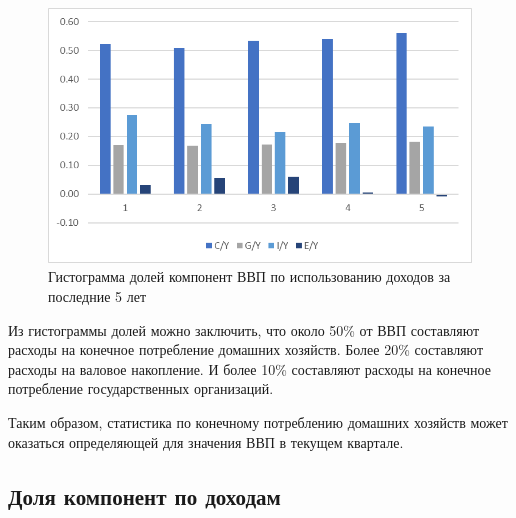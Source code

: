 \documentclass[a4paper, 14pt]{extreport}
\numberwithin{equation}{section}
\numberwithin{equation}{section}
\begin{document}
	\begin{figure}[h!]\label{pic2.2}
		\centering
		\includegraphics[scale=1]{images/image02}
		\caption{Гистограмма долей компонент ВВП по использованию доходов за последние 5 лет}
		\label{fig:image02}
	\end{figure}
	
	Из гистограммы долей можно заключить, что около 50\% от ВВП составляют расходы на конечное потребление домашних хозяйств. Более 20\% составляют расходы на валовое накопление. И более 10\% составляют расходы на конечное потребление государственных организаций.
	
	Таким образом, статистика по конечному потреблению домашних хозяйств может оказаться определяющей для значения ВВП в текущем квартале.

	\subsection{Доля компонент по доходам}
	
\end{document}
